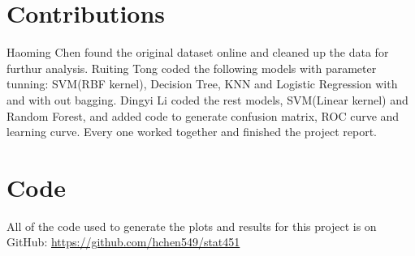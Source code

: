 \documentclass[10pt,twocolumn,letterpage]{article}
\begin{document}
	

	\section{Contributions}
	Haoming Chen found the original dataset online and cleaned up the data for furthur analysis. Ruiting Tong coded the following models with parameter tunning: SVM(RBF kernel), Decision Tree, KNN and Logistic Regression with and with out bagging. Dingyi Li coded the rest models, SVM(Linear kernel) and Random Forest, and added code to generate confusion matrix, ROC curve and learning curve. Every one worked together and finished the project report.
	\section{Code}
	All of the code used to generate the plots and results for this project is on GitHub: \url{https://github.com/hchen549/stat451}

		
	
\end{document}

